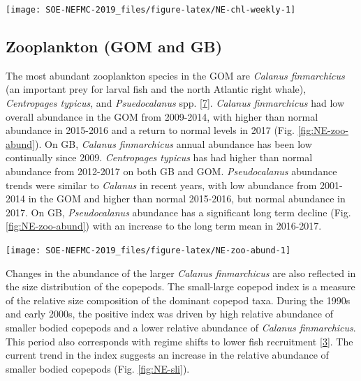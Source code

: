 \documentclass[10pt,]{article}
\let\origfigure\figure
\let\endorigfigure\endfigure
\renewenvironment{figure}[1][2] {
    \expandafter\origfigure\expandafter[H]
} {
    \endorigfigure
}
\begin{document}
\begin{figure}

{\centering \texttt{[image: SOE-NEFMC-2019\_files/figure-latex/NE-chl-weekly-1]} 

}

\caption{Weekly chlorophyll concentrations and primary productivity for 2018 in Gulf of Maine and Georges Bank are shown by the colored lines in the above figures. The long-term mean is shown in black and shading indicates +/- 1 sample SD.}\label{fig:NE-chl-weekly}
\end{figure}

\subsection{Zooplankton (GOM and GB)}\label{zooplankton-gom-and-gb}

The most abundant zooplankton species in the GOM are \emph{Calanus
finmarchicus} (an important prey for larval fish and the north Atlantic
right whale), \emph{Centropages typicus}, and \emph{Psuedocalanus} spp.
{[}\protect\hyperlink{ref-morse_distinct_2017}{7}{]}. \emph{Calanus
finmarchicus} had low overall abundance in the GOM from 2009-2014, with
higher than normal abundance in 2015-2016 and a return to normal levels
in 2017 (Fig. \ref{fig:NE-zoo-abund}). On GB, \emph{Calanus
finmarchicus} annual abundance has been low continually since 2009.
\emph{Centropages typicus} has had higher than normal abundance from
2012-2017 on both GB and GOM. \emph{Pseudocalanus} abundance trends were
similar to \emph{Calanus} in recent years, with low abundance from
2001-2014 in the GOM and higher than normal 2015-2016, but normal
abundance in 2017. On GB, \emph{Pseudocalanus} abundance has a
significant long term decline (Fig. \ref{fig:NE-zoo-abund}) with an
increase to the long term mean in 2016-2017.

\begin{figure}

{\centering \texttt{[image: SOE-NEFMC-2019\_files/figure-latex/NE-zoo-abund-1]} 

}

\caption{Abundance anomaly time series for key zooplankton species found in the GOM and GB.}\label{fig:NE-zoo-abund}
\end{figure}

Changes in the abundance of the larger \emph{Calanus finmarchicus} are
also reflected in the size distribution of the copepods. The small-large
copepod index is a measure of the relative size composition of the
dominant copepod taxa. During the 1990s and early 2000s, the positive
index was driven by high relative abundance of smaller bodied copepods
and a lower relative abundance of \emph{Calanus finmarchicus}. This
period also corresponds with regime shifts to lower fish recruitment
{[}\protect\hyperlink{ref-perretti_regime_2017}{3}{]}. The current trend
in the index suggests an increase in the relative abundance of smaller
bodied copepods (Fig. \ref{fig:NE-sli}).
\end{document}
